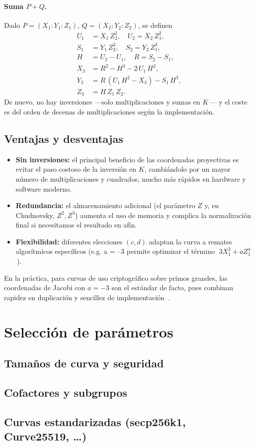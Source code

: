 \paragraph{Suma \(P+Q\).} Dado \(P=(X_1:Y_1:Z_1)\), \(Q=(X_2:Y_2:Z_2)\), se definen
\[
\begin{aligned}
  U_1 &= X_1\,Z_2^2,\quad U_2 = X_2\,Z_1^2,\\
  S_1 &= Y_1\,Z_2^3,\quad S_2 = Y_2\,Z_1^3,\\
  H   &= U_2 - U_1,\quad R = S_2 - S_1,\\
  X_3 &= R^2 - H^3 - 2\,U_1\,H^2,\\
  Y_3 &= R\,(U_1\,H^2 - X_3) - S_1\,H^3,\\
  Z_3 &= H\,Z_1\,Z_2.
\end{aligned}
\]
De nuevo, no hay inversiones —solo multiplicaciones y sumas en \(K\)\,— y el coste es del orden de decenas de multiplicaciones según la implementación.

\subsection{Ventajas y desventajas}

\begin{itemize}
  \item \textbf{Sin inversiones:} el principal beneficio de las coordenadas proyectivas es evitar el paso costoso de la inversión en \(K\), cambiándolo por un mayor número de multiplicaciones y cuadrados, mucho más rápidos en hardware y software moderno.
  \item \textbf{Redundancia:} el almacenamiento adicional (el parámetro \(Z\) y, en Chudnovsky, \(Z^2,Z^3\)) aumenta el uso de memoria y complica la normalización final si necesitamos el resultado en afín.
  \item \textbf{Flexibilidad:} diferentes elecciones \((c,d)\) adaptan la curva a remates algorítmicos específicos (e.g. a = –3 permite optimizar el término \(\;3X_1^2 + aZ_1^4\)\,).
\end{itemize}

En la práctica, para curvas de uso criptográfico sobre primos grandes, las coordenadas de Jacobi con \(a=-3\) son el estándar de facto, pues combinan rapidez en duplicación y sencillez de implementación~\cite{IEEE1363}.


\section{Selección de parámetros}
\subsection{Tamaños de curva y seguridad}
\subsection{Cofactores y subgrupos}
\subsection{Curvas estandarizadas (secp256k1, Curve25519, …)}
